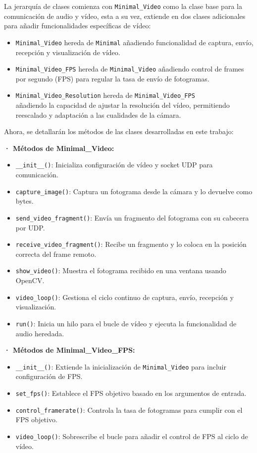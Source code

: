 La jerarquía de clases comienza con \texttt{Minimal\_Video} como la clase base para la comunicación de audio y vídeo, esta a su vez, extiende en dos clases adicionales para añadir funcionalidades específicas de vídeo:
\begin{itemize} 
    \item \texttt{Minimal\_Video} hereda de \texttt{Minimal} añadiendo funcionalidad de captura, envío, recepción y visualización de vídeo. 
    \item \texttt{Minimal\_Video\_FPS} hereda de \texttt{Minimal\_Video} añadiendo control de frames por segundo (FPS) para regular la tasa de envío de fotogramas. 
    \item \texttt{Minimal\_Video\_Resolution} hereda de \texttt{Minimal\_Video\_FPS} \\
    añadiendo la capacidad de ajustar la resolución del vídeo, permitiendo reescalado y adaptación a las cualidades de la cámara.
\end{itemize}

Ahora, se detallarán los métodos de las clases desarrolladas en este trabajo:
\vspace{\baselineskip}

\textbf{· Métodos de Minimal\_Video:} 
\begin{itemize} 
    \item \texttt{\_\_init\_\_()}: Inicializa configuración de vídeo y socket UDP para comunicación. 
    \item \texttt{capture\_image()}: Captura un fotograma desde la cámara y lo devuelve como bytes. 
    \item \texttt{send\_video\_fragment()}: Envía un fragmento del fotograma con su cabecera por UDP. 
    \item \texttt{receive\_video\_fragment()}: Recibe un fragmento y lo coloca en la posición correcta del frame remoto. 
    \item \texttt{show\_video()}: Muestra el fotograma recibido en una ventana usando OpenCV. 
    \item \texttt{video\_loop()}: Gestiona el ciclo continuo de captura, envío, recepción y visualización. 
    \item \texttt{run()}: Inicia un hilo para el bucle de vídeo y ejecuta la funcionalidad de audio heredada. 
\end{itemize}

\textbf{· Métodos de Minimal\_Video\_FPS:} 
\begin{itemize} 
    \item \texttt{\_\_init\_\_()}: Extiende la inicialización de \texttt{Minimal\_Video} para incluir configuración de FPS. 
    \item \texttt{set\_fps()}: Establece el FPS objetivo basado en los argumentos de entrada. 
    \item \texttt{control\_framerate()}: Controla la tasa de fotogramas para cumplir con el FPS objetivo.
    \item \texttt{video\_loop()}: Sobrescribe el bucle para añadir el control de FPS al ciclo de vídeo. 
\end{itemize}

